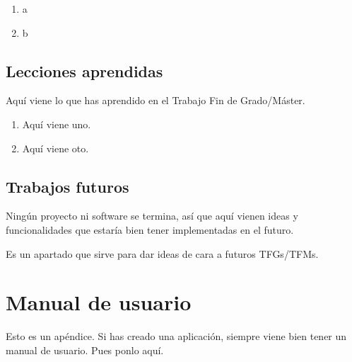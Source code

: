 \documentclass[a4paper, 12pt]{book}
\begin{document}
\begin{enumerate}
  \item a
  \item b
\end{enumerate}


\section{Lecciones aprendidas}
\label{sec:lecciones_aprendidas}

Aquí viene lo que has aprendido en el Trabajo Fin de Grado/Máster.

\begin{enumerate}
  \item Aquí viene uno.
  \item Aquí viene oto.
\end{enumerate}


\section{Trabajos futuros}
\label{sec:trabajos_futuros}

Ningún proyecto ni software se termina, así que aquí vienen ideas y funcionalidades que estaría bien tener implementadas en el futuro.

Es un apartado que sirve para dar ideas de cara a futuros TFGs/TFMs.



\cleardoublepage
\appendix
\chapter{Manual de usuario}
\label{app:manual}

Esto es un apéndice.
Si has creado una aplicación, siempre viene bien tener un manual de usuario.
Pues ponlo aquí.


\cleardoublepage


\end{document}
